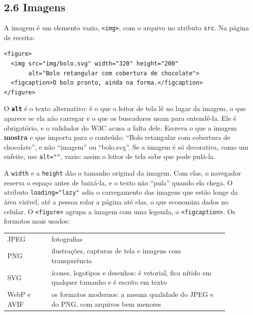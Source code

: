 \subsection{2.6 Imagens}

A imagem é um elemento vazio, \texttt{<img>}, com o arquivo no atributo \texttt{src}. Na página de receita:

\begin{codigo}
\begin{Verbatim}[breaklines=true, breaksymbolleft={}, fontsize=\footnotesize]
<figure>
  <img src="img/bolo.svg" width="320" height="200"
       alt="Bolo retangular com cobertura de chocolate">
  <figcaption>O bolo pronto, ainda na forma.</figcaption>
</figure>
\end{Verbatim}
\end{codigo}

O \textbf{\texttt{alt}} é o texto alternativo: é o que o leitor de tela lê no lugar da imagem, o que aparece se ela não carregar e o que os buscadores usam para entendê-la. Ele é obrigatório, e o validador do W3C acusa a falta dele. Escreva o que a imagem \textbf{mostra} e que importa para o conteúdo: ``Bolo retangular com cobertura de chocolate'', e não ``imagem'' ou ``bolo.svg''. Se a imagem é só decorativa, como um enfeite, use \texttt{alt=""}, vazio: assim o leitor de tela sabe que pode pulá-la.

A \texttt{width} e a \texttt{height} dão o tamanho original da imagem. Com elas, o navegador reserva o espaço antes de baixá-la, e o texto não ``pula'' quando ela chega. O atributo \texttt{loading="lazy"} adia o carregamento das imagens que estão longe da área visível, até a pessoa rolar a página até elas, o que economiza dados no celular. O \texttt{<figure>} agrupa a imagem com uma legenda, o \texttt{<figcaption>}. Os formatos mais usados:

\begin{center}
\begin{tabular}{@{}P{0.18\linewidth}P{0.72\linewidth}@{}}
\toprule
{}
 &  \\
\midrule
JPEG & fotografias \\
 PNG & ilustrações, capturas de tela e imagens com transparência \\
SVG & ícones, logotipos e desenhos: é vetorial, fica nítido em qualquer tamanho e é escrito em texto \\
 WebP e AVIF & os formatos modernos: a mesma qualidade do JPEG e do PNG, com arquivos bem menores \\
\bottomrule
\end{tabular}
\end{center}

